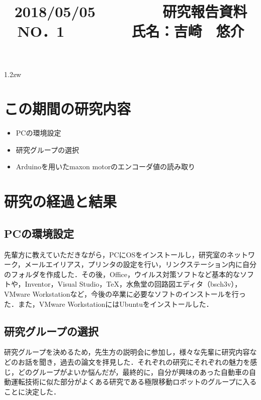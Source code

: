 \documentclass[a4j，10pt]{jarticle}
\begin{document}
\title{{\large 2018/05/05} 　　　　 {\LARGE 研究報告資料  NO．1} 　　 　　{\large 氏名：吉崎　悠介}}



\date{\empty}
\maketitle
\pagestyle{plain}
\baselineskip  1.2zw


\section{この期間の研究内容}
\begin{itemize}
\item{PCの環境設定}
\item{研究グループの選択}
\item{Arduinoを用いたmaxon motorのエンコーダ値の読み取り}
\end{itemize}


\section{研究の経過と結果}
\subsection{PCの環境設定}
先輩方に教えていただきながら，PCにOSをインストールし，研究室のネットワーク，メールエイリアス，プリンタの設定を行い，リンクステーション内に自分のフォルダを作成した．その後，Office，ウイルス対策ソフトなど基本的なソフトや，Inventor，Visual Studio，TeX，水魚堂の回路図エディタ（bsch3v），VMware Workstationなど，今後の卒業に必要なソフトのインストールを行った．また，VMware WorkstationにはUbuntuをインストールした． \\

\subsection{研究グループの選択}
研究グループを決めるため，先生方の説明会に参加し，様々な先輩に研究内容などのお話を聞き，過去の論文を拝見した．それぞれの研究にそれぞれの魅力を感じ，どのグループがよいか悩んだが，最終的に，自分が興味のあった自動車の自動運転技術に似た部分がよくある研究である極限移動ロボットのグループに入ることに決定した．\\
\end{document}
